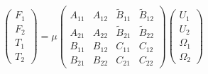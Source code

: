 \documentclass[12pt]{article}
\begin{document}
\begin{eqnarray*}
    \left( \begin{matrix} F_1 \\ F_2 \\ T_1 \\ T_2 \end{matrix} \right) = \mu
    \left( \begin{matrix}
    A_{11} & A_{12} & \tilde{B}_{11} & \tilde{B}_{12} \\
    A_{21} & A_{22} & \tilde{B}_{21} & \tilde{B}_{22} \\
    B_{11} & B_{12} & C_{11} & C_{12} \\
    B_{21} & B_{22} & C_{21} & C_{22} 
    \end{matrix} \right) 
    \left( \begin{matrix} U_1 \\ U_2 \\ \Omega_1 \\ \Omega_2 \end{matrix} \right)
\end{eqnarray*}
\end{document}
